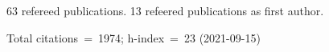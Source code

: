 63 refereed publications. 13 refeered publications as first author.

Total citations~=~1974; h-index~=~23 (2021-09-15)